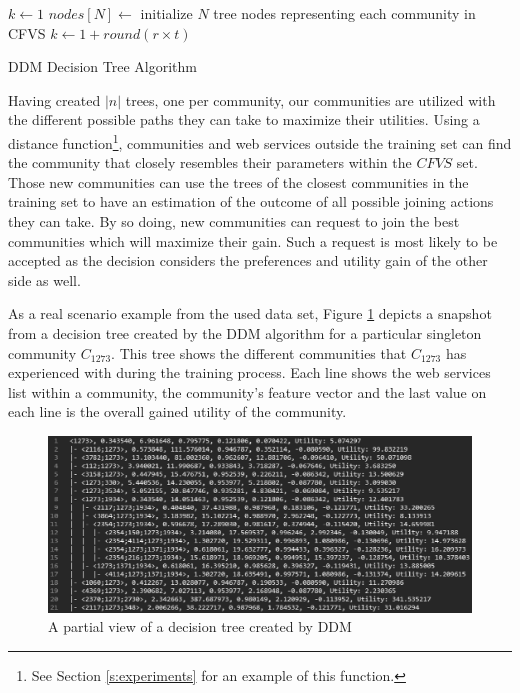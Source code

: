 \begin{algorithm}
\DontPrintSemicolon
{}
$k \gets 1$\;
$nodes[N] \gets$ initialize $N$ tree nodes representing each community in CFVS\;
 {
	$k \gets 1 + round (r \times t)$\;
   {
	   {
		}
  }
}
\;
\caption{{\sc DDM Decision Tree Algorithm}}
\label{algo:dectree}
\end{algorithm}

Having created $|n|$ trees, one per community, our communities are utilized with the different possible paths they can take to maximize their utilities. Using a distance function\footnote{See Section \ref{s:experiments} for an example of this function.}, communities and web services outside the training set can find the community that closely resembles their parameters within the $CFVS$ set. Those new communities can use the trees of the closest communities in the training set to have an estimation of the outcome of all possible joining actions they can take. By so doing, new communities can request to join the best communities which will maximize their gain. Such a request is most likely to be accepted as the decision considers the preferences and utility gain of the other side as well.

As a real scenario example from the used data set, Figure \ref{fig_tree} depicts a snapshot from a decision tree created by the DDM algorithm for a particular singleton community $C_{1273}$. This tree shows the different communities that $C_{1273}$ has experienced with during the training process. Each line shows the web services list within a community, the community's feature vector and the last value on each line is the overall gained  utility of the community.


\begin{figure}%
\centerline{\includegraphics[width=6.25in]{figures/tree1.eps}}
\caption{A partial view of a decision tree created by DDM}
\label{fig_tree}
\end{figure}

